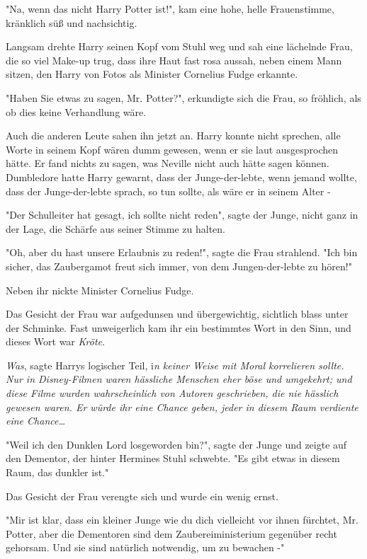 {"Na, wenn das nicht Harry Potter ist!", kam eine hohe, helle Frauenstimme, kränklich süß und nachsichtig.

Langsam drehte Harry seinen Kopf vom Stuhl weg und sah eine lächelnde Frau, die so viel Make-up trug, dass ihre Haut fast rosa aussah, neben einem Mann sitzen, den Harry von Fotos als Minister Cornelius Fudge erkannte.

"Haben Sie etwas zu sagen, Mr. Potter?", erkundigte sich die Frau, so fröhlich, als ob dies keine Verhandlung wäre.

Auch die anderen Leute sahen ihn jetzt an. Harry konnte nicht sprechen, alle Worte in seinem Kopf wären dumm gewesen, wenn er sie laut ausgesprochen hätte. Er fand nichts zu sagen, was Neville nicht auch hätte sagen können. Dumbledore hatte Harry gewarnt, dass der Junge-der-lebte, wenn jemand wollte, dass der Junge-der-lebte sprach, so tun sollte, als wäre er in seinem Alter -

"Der Schulleiter hat gesagt, ich sollte nicht reden", sagte der Junge, nicht ganz in der Lage, die Schärfe aus seiner Stimme zu halten.

"Oh, aber du hast unsere Erlaubnis zu reden!", sagte die Frau strahlend. "Ich bin sicher, das Zaubergamot freut sich immer, von dem Jungen-der-lebte zu hören!"

Neben ihr nickte Minister Cornelius Fudge.

Das Gesicht der Frau war aufgedunsen und übergewichtig, sichtlich blass unter der Schminke. Fast unweigerlich kam ihr ein bestimmtes Wort in den Sinn, und dieses Wort war \emph{Kröte}.

\emph{Was}, sagte Harrys logischer Teil, i\emph{n keiner Weise mit Moral korrelieren sollte. Nur in Disney-Filmen waren hässliche Menschen eher böse und umgekehrt; und diese Filme wurden wahrscheinlich von Autoren geschrieben, die nie hässlich gewesen waren. Er würde ihr eine Chance geben, jeder in diesem Raum verdiente eine Chance…}

"Weil ich den Dunklen Lord losgeworden bin?", sagte der Junge und zeigte auf den Dementor, der hinter Hermines Stuhl schwebte. "Es gibt etwas in diesem Raum, das dunkler ist."

Das Gesicht der Frau verengte sich und wurde ein wenig ernst.

"Mir ist klar, dass ein kleiner Junge wie du dich vielleicht vor ihnen fürchtet, Mr. Potter, aber die Dementoren sind dem Zaubereiministerium gegenüber recht gehorsam. Und sie sind natürlich notwendig, um zu bewachen -"

}
